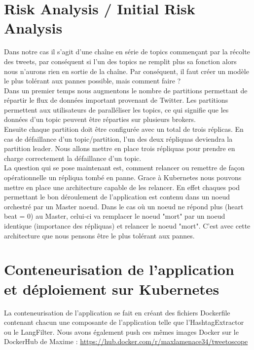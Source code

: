 \documentclass{article}
\begin{document}
\section{Risk Analysis / Initial Risk Analysis}
Dans notre cas il s'agit d'une chaîne en série de topics commençant par la récolte des tweets, par conséquent si l'un des topics ne remplit plus sa fonction alors nous n'aurons rien en sortie de la chaîne. Par conséquent, il faut créer un modèle le plus tolérant aux pannes possible, mais comment faire ?\\

Dans un premier temps nous augmentons le nombre de partitions permettant de répartir le flux de données important provenant de Twitter. Les partitions permettent aux utilisateurs de paralléliser les topics, ce qui signifie que les données d'un topic peuvent être réparties sur plusieurs brokers. \\
Ensuite chaque partition doit être configurée avec un total de trois réplicas. En cas de défaillance d'un topic/partition, l'un des deux répliquas deviendra la partition leader. Nous allons mettre en place trois répliquas pour prendre en charge correctement la défaillance d'un topic. \\

La question qui se pose maintenant est, comment relancer ou remettre de façon opérationnelle un répliqua tombé en panne. Grace à Kubernetes nous pouvons mettre en place une architecture capable de les relancer.
En effet chaques pod permettant le bon déroulement de l'application est contenu dans un noeud orchestré  par un Master noeud. Dans le cas où un noeud ne répond plus (heart beat = 0) au Master, celui-ci va remplacer le noeud "mort" par un noeud identique (importance des répliquas) et relancer le noeud "mort". C'est avec cette architecture que nous pensons être le plus tolérant aux pannes.

\section{Conteneurisation de l'application et déploiement sur Kubernetes}

La conteneurisation de l'application se fait en créant des fichiers Dockerfile contenant chacun une composante de l'application telle que l'HashtagExtractor ou le LangFilter. Nous avons également push ces mêmes images Docker sur le DockerHub de Maxime : \href{https://hub.docker.com/r/maxlamenace34/tweetoscope}{https://hub.docker.com/r/maxlamenace34/tweetoscope} \\
\end{document}
